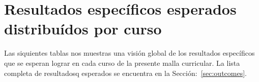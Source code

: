 \section{Resultados específicos esperados distribuí­dos por curso}\label{sec:specific-outcomes-by-course}
Las siquientes tablas nos muestras una visión global de los resultados específicos que se esperan lograr en cada 
curso de la presente malla curricular. 
La lista completa de resultadosq esperados se encuentra en la Sección:~\ref{sec:outcomes}.
